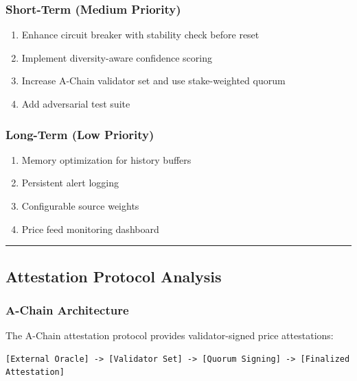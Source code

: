 \documentclass[
]{article}
\providecommand{\tightlist}{%
  \setlength{\itemsep}{0pt}\setlength{\parskip}{0pt}}
\begin{document}
\subsubsection{Short-Term (Medium
Priority)}\label{short-term-medium-priority}

\begin{enumerate}
\def\labelenumi{\arabic{enumi}.}
\setcounter{enumi}{4}
\tightlist
\item
  Enhance circuit breaker with stability check before reset
\item
  Implement diversity-aware confidence scoring
\item
  Increase A-Chain validator set and use stake-weighted quorum
\item
  Add adversarial test suite
\end{enumerate}

\subsubsection{Long-Term (Low Priority)}\label{long-term-low-priority}

\begin{enumerate}
\def\labelenumi{\arabic{enumi}.}
\setcounter{enumi}{8}
\tightlist
\item
  Memory optimization for history buffers
\item
  Persistent alert logging
\item
  Configurable source weights
\item
  Price feed monitoring dashboard
\end{enumerate}

\begin{center}\rule{0.5\linewidth}{0.5pt}\end{center}

\subsection{Attestation Protocol
Analysis}\label{attestation-protocol-analysis}

\subsubsection{A-Chain Architecture}\label{a-chain-architecture}

The A-Chain attestation protocol provides validator-signed price
attestations:

\begin{verbatim}
[External Oracle] -> [Validator Set] -> [Quorum Signing] -> [Finalized Attestation]
\end{verbatim}
\end{document}
